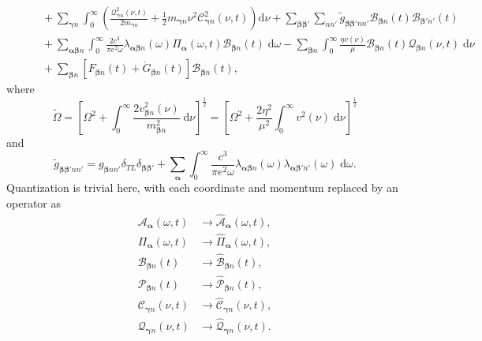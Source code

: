 \documentclass{article}
\begin{document}
\begin{equation}
\begin{split}
&\qquad + \sum_{\bm{\gamma}n}\int_0^\infty\left(\frac{\mathcal{Q}_{\bm{\gamma}n}^2(\nu,t)}{2m_{\bm{\gamma}n}} + \frac{1}{2}m_{\bm{\gamma}n}\nu^2\mathcal{C}_{\bm{\gamma}n}^2(\nu,t)\right)\mathrm{d}\nu + \sum_{\bm{\beta}\bm{\beta}'}\sum_{nn'}\tilde{g}_{\bm{\beta}\bm{\beta}'nn'}\mathcal{B}_{\bm{\beta}n}(t)\mathcal{B}_{\bm{\beta}'n'}(t)\\
&\qquad + \sum_{\bm{\alpha}\bm{\beta}n}\int_0^\infty\frac{2c^3}{\pi e^2\omega}\lambda_{\bm{\alpha}\bm{\beta}n}(\omega)\mathit{\Pi}_{\bm{\alpha}}(\omega,t)\mathcal{B}_{\bm{\beta}n}(t)\;\mathrm{d}\omega - \sum_{\bm{\beta}n}\int_0^\infty\frac{\eta v(\nu)}{\mu}\mathcal{B}_{\bm{\beta}n}(t)\mathcal{Q}_{\bm{\beta}n}(\nu,t)\;\mathrm{d}\nu\\
&\qquad + \sum_{\bm{\beta}n}\left[F_{\bm{\beta}n}(t) + \dot{G}_{\bm{\beta}n}(t)\right]\mathcal{B}_{\bm{\beta}n}(t),
\end{split}
\end{equation}
where
\begin{equation}
\tilde{\Omega} = \left[\Omega^2 + \int_0^\infty\frac{2v_{\bm{\beta}n}^2(\nu)}{m_{\bm{\beta}n}^2}\;\mathrm{d}\nu\right]^\frac{1}{2} = \left[\Omega^2 + \frac{2\eta^2}{\mu^2}\int_0^\infty v^2(\nu)\;\mathrm{d}\nu\right]^\frac{1}{2}
\end{equation}
and
\begin{equation}
\tilde{g}_{\bm{\beta}\bm{\beta}'nn'} = g_{\bm{\beta}nn'}\delta_{TL}\delta_{\bm{\beta}\bm{\beta}'} + \sum_{\bm{\alpha}}\int_0^\infty\frac{c^3}{\pi e^2\omega}\lambda_{\bm{\alpha}\bm{\beta}n}(\omega)\lambda_{\bm{\alpha}\bm{\beta}'n'}(\omega)\;\mathrm{d}\omega.
\end{equation}
Quantization is trivial here, with each coordinate and momentum replaced by an operator as
\begin{equation}
\begin{split}
\mathcal{A}_{\bm{\alpha}}(\omega,t)&\to\hat{\mathcal{A}}_{\bm{\alpha}}(\omega,t),\\
\mathit{\Pi}_{\bm{\alpha}}(\omega,t)&\to\hat{\mathit{\Pi}}_{\bm{\alpha}}(\omega,t),\\
\mathcal{B}_{\bm{\beta}n}(t)&\to\hat{\mathcal{B}}_{\bm{\beta}n}(t),\\
\mathcal{P}_{\bm{\beta}n}(t)&\to\hat{\mathcal{P}}_{\bm{\beta}n}(t),\\
\mathcal{C}_{\bm{\gamma}n}(\nu,t)&\to\hat{\mathcal{C}}_{\bm{\gamma}n}(\nu,t),\\
\mathcal{Q}_{\bm{\gamma}n}(\nu,t)&\to\hat{\mathcal{Q}}_{\bm{\gamma}n}(\nu,t).
\end{split}
\end{equation}
\end{document}
